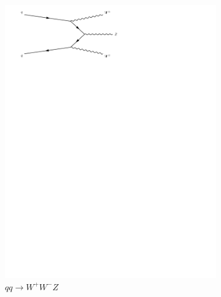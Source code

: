 \begin{figure}[h]
\begin{subfigure}[b]{0.3\textwidth}
    \includegraphics[trim={0.5cm 22cm 10cm 0cm},width=\textwidth]{../Diagrams/D10.pdf}
    \caption{$qq\rightarrow W^{+}W^{-}Z$}
    \label{fey:10}
  \end{subfigure}%
  ~
  \begin{subfigure}[b]{0.3\textwidth}

\end{subfigure}
\end{figure}
